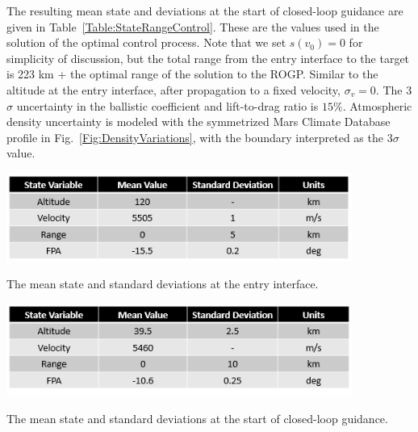 The resulting mean state and deviations at the start of closed-loop guidance are given in Table~\ref{Table:StateRangeControl}. These are the values used in the solution of the optimal control process. Note that we set $s(v_0) = 0$ for simplicity of discussion, but the total range from the entry interface to the target is 223 km + the optimal range of the solution to the ROGP. 
Similar to the altitude at the entry interface, after propagation to a fixed velocity, $\sigma_v = 0$. The 3$\sigma$ uncertainty in the ballistic coefficient and lift-to-drag ratio is $15\%$. Atmospheric density uncertainty is modeled with the symmetrized Mars Climate Database profile in Fig.~\ref{Fig:DensityVariations}, with the boundary interpreted as the 3$\sigma$ value.
\begin{table}[h!]
	\centering
	\includegraphics[width=0.85\textwidth]{Images/EntryInterfaceState}
	\caption{The mean state and standard deviations at the entry interface.}
	\label{Table:StateEntryInterface}
\end{table}
\begin{table}[h!]
	\centering
	\includegraphics[width=0.85\textwidth]{Images/OptimizationState}
	\caption{The mean state and standard deviations at the start of closed-loop guidance.}
	\label{Table:StateRangeControl}
\end{table}

